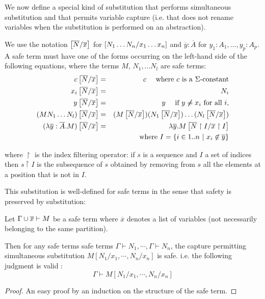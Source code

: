 We now define a special kind of substitution that performs simultaneous substitution and
that permits variable capture (i.e. that does not rename variables when the substitution is performed on an abstraction).

\begin{dfn}
\label{dnf:safe_simsubst}
 We use the notation $\left[ \overline{N}/\overline{x} \right]$ for $\left[ N_1 \ldots N_n/x_1 \ldots x_n \right]$ and
$\overline{y}:\overline{A}$ for $y_1:A_1, \ldots, y_p:A_p$.
A safe term must have one of the forms occurring on the left-hand side of the following equations, where
the terms $M$, $N_1, \ldots N_l$ are safe terms:
\begin{eqnarray*}
c \left[ \overline{N}/\overline{x} \right] &=& c \quad \mbox{ where $c$ is a $\Sigma$-constant}\\
x_i \left[ \overline{N}/\overline{x} \right] &=& N_i\\
 y \left[ \overline{N}/\overline{x} \right] &=& y \quad \mbox{ if } y \not \neq x_i \mbox{ for all } i,\\
(M N_1 \ldots N_l) \left[ \overline{N}/\overline{x} \right] &=& (M \left[ \overline{N}/\overline{x} \right]) (N_1 \left[ \overline{N}/\overline{x} \right]) \ldots  (N_l \left[ \overline{N}/\overline{x} \right])\\
(\lambda \overline{y} : \overline{A}. M)
\left[ \overline{N}/\overline{x} \right] &=& \lambda \overline{y} . M
\left[ \overline{N} \upharpoonright I/\overline{x} \upharpoonright I \right] \\
&& \mbox{where } I  = \{ i \in 1..n \ | \ x_i \not \in \overline{y} \}
\end{eqnarray*}

where $ \upharpoonright$ is the index filtering operator: if $s$ is a sequence and $I$ a set of indices then
$s \upharpoonright I$ is the subsequence of $s$ obtained by removing from $s$ all the elements
at a position that is not in $I$.
\end{dfn}

This substitution is well-defined for safe terms in the sense that safety is preserved by substitution:

\begin{lem}
\label{lem:subst_preserve_safety}
Let $\Gamma \cup \overline{x} \vdash M$ be a safe term where $\overline{x}$ denotes a list of variables
(not necessarily belonging to the same partition).

Then for any safe terms safe terms $\Gamma \vdash N_1, \cdots, \Gamma \vdash N_n$,
the capture permitting simultaneous substitution $M[N_1 / x_1 , \cdots, N_n / x_n]$ is safe. i.e. the following judgment is valid :
$$ \Gamma \vdash M[N_1 / x_1 , \cdots, N_n / x_n] $$
\end{lem}
\begin{proof}
An easy proof by an induction on the structure of the safe term.
\end{proof}




